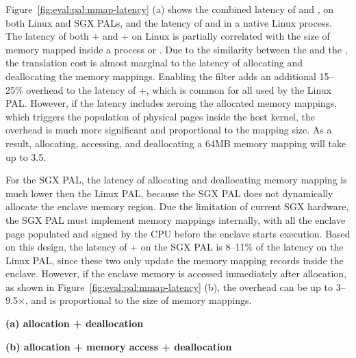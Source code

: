 Figure~\ref{fig:eval:pal:mmap-latency} (a)
shows the combined latency of  and  , on both Linux and SGX PALs,
and the latency of  and  in a native Linux process.
The latency of both + and + on Linux is partially correlated with the size of memory mapped inside a process or \picoproc{}.
Due to the similarity between the \hostapis{} and the \linuxapis{},
the translation cost is almost marginal
to the latency of allocating and deallocating the memory mappings.
Enabling the \seccomp{} filter adds an additional
15--25\% overhead to the latency of +, which is common for all \linuxapis{} used by the Linux PAL.
However, if the latency includes zeroing the allocated memory mappings,
which triggers the population of physical pages
inside the host kernel,
the overhead is much more significant and proportional to the mapping size.
As a result, allocating, accessing, and deallocating a 64MB memory mapping will take up to \roughly{}3.5\msec{}.


For the SGX PAL, the latency of allocating and deallocating memory mapping
is much lower then the Linux PAL, because the SGX PAL does not dynamically allocate the enclave memory region.
Due the limitation of current SGX hardware,
the SGX PAL must implement memory mappings internally,
with all the enclave page populated and signed by the CPU before the enclave starts execution.
Based on this design, the latency of + on the SGX PAL
is 8--11\% of the latency on the Linux PAL,
since these two \hostapis{} only update the memory mapping records inside the enclave.
However, if the enclave memory is accessed immediately after allocation, as shown in Figure~\ref{fig:eval:pal:mmap-latency} (b),
the overhead can be up to 3--9.5$\times$, and is proportional to the size of memory mappings.

\begin{figure*}[t!]
\centering
\footnotesize
{}
\parbox{0.49\textwidth}{\centering\bf (a) allocation + deallocation}
\parbox{0.49\textwidth}{\centering\bf (b) allocation + memory access + deallocation}
\caption{Latency of (a) allocating and deallocating a range of virtual pages, and (b) the same operations with writing to each page after allocation. Lower is better.
The comparison is between (1)  and  on Linux; (2)  and  on the Linux PAL, with and without a \seccomp{} filter ({\bf +SC}) and reference monitor ({\bf +RM}); (3) the same \hostapis{} on the SGX PAL, with and without zeroing the pages before use ({\bf +Zero}).}
\label{fig:eval:pal:mmap-latency}
\end{figure*}


